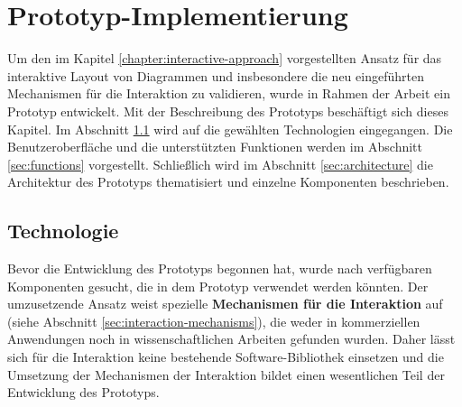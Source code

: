 
\chapter{Prototyp-Implementierung}
\label{chapter:prototype}

Um den im Kapitel \ref{chapter:interactive-approach} vorgestellten Ansatz für das interaktive Layout von Diagrammen und insbesondere die neu eingeführten Mechanismen für die Interaktion zu validieren, wurde in Rahmen der Arbeit ein Prototyp entwickelt. Mit der Beschreibung des Prototyps beschäftigt sich dieses Kapitel. Im Abschnitt \ref{sec:technologies} wird auf die gewählten Technologien eingegangen. Die Benutzeroberfläche und die unterstützten Funktionen werden im Abschnitt \ref{sec:functions} vorgestellt. Schließlich wird im Abschnitt \ref{sec:architecture} die Architektur des Prototyps thematisiert und einzelne Komponenten beschrieben.

\section{Technologie}
\label{sec:technologies}

Bevor die Entwicklung des Prototyps begonnen hat, wurde nach verfügbaren Komponenten gesucht, die in dem Prototyp verwendet werden könnten. Der umzusetzende Ansatz weist spezielle \textbf{Mechanismen für die Interaktion} auf (siehe Abschnitt \ref{sec:interaction-mechanisms}), die weder in kommerziellen Anwendungen noch in wissenschaftlichen Arbeiten gefunden wurden. Daher lässt sich für die Interaktion keine bestehende Software-Bibliothek einsetzen und die Umsetzung der Mechanismen der Interaktion bildet einen wesentlichen Teil der Entwicklung des Prototyps.

